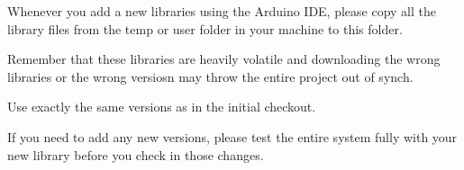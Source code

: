 Whenever you add a new libraries using the Arduino I\+DE, please copy all the library files from the temp or user folder in your machine to this folder.

Remember that these libraries are heavily volatile and downloading the wrong libraries or the wrong versiosn may throw the entire project out of synch.

Use exactly the same versions as in the initial checkout.

If you need to add any new versions, please test the entire system fully with your new library before you check in those changes. 